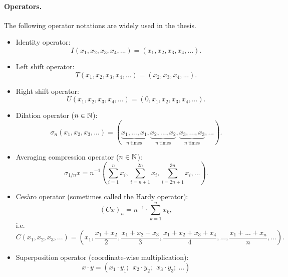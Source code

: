 \paragraph{Operators.}
The following operator notations are widely used in the thesis.
\begin{itemize}
	\item
		Identity operator:
		\begin{equation}
			I(x_1, x_2, x_3, x_4, ...) = (x_1, x_2, x_3, x_4, ...)
			.
		\end{equation}
	\item
		Left shift operator:
		\begin{equation}
			T(x_1, x_2, x_3, x_4, ...) = (x_2, x_3, x_4, ...)
			.
		\end{equation}
	\item
		Right shift operator:
		\begin{equation}
			U(x_1, x_2, x_3, x_4, ...) = (0, x_1, x_2, x_3, x_4, ...)
			.
		\end{equation}
	\item
		Dilation operator (\(n\in\mathbb{N}\)):
		\begin{equation}
			\sigma_n (x_1, x_2, x_3, ...) = (
				\underbrace{x_1,...,x_1}_{n~\text{times}},
				\underbrace{x_2,...,x_2}_{n~\text{times}},
				\underbrace{x_3,...,x_3}_{n~\text{times}},
				...)
			.
		\end{equation}
	\item
		Averaging compression operator (\(n\in\mathbb{N}\)):
		\begin{equation}
			\sigma_{1/n} x = n^{-1}
			\left(
				\sum_{i=1}^{n} x_i,
				\sum_{i=n+1}^{2n} x_i,
				\sum_{i=2n+1}^{3n} x_i,
				...
			\right).
		\end{equation}
	\item
		Cesàro operator (sometimes called the Hardy operator):
		\begin{equation}
			(Cx)_n = n^{-1} \cdot \sum_{k=1}^n x_k
			,
		\end{equation}
		i.e.
		\begin{equation}
			C (x_1, x_2, x_3, ...) = \left(
			x_1,
			\dfrac{x_1+x_2}2,
			\dfrac{x_1+x_2 + x_3}3,
			\dfrac{x_1+x_2+x_3+x_4}4,
			...,
			\dfrac{x_1+...+x_n}n,
			...\right)
			.
		\end{equation}

	\item
		Superposition operator (coordinate-wise multiplication):
		\begin{equation}
			x \cdot y = (x_1\cdot y_1; ~~x_2\cdot y_2; ~~x_3\cdot y_3; ~...)
		\end{equation}
\end{itemize}

